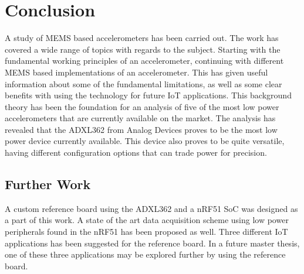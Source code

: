 \chapter{Conclusion}

A study of MEMS based accelerometers has been carried out. The work has covered a wide range of topics with regards to the subject. Starting with the fundamental working principles of an accelerometer, continuing with different MEMS based implementations of an accelerometer. This has given useful information about some of the fundamental limitations, as well as some clear benefits with using the technology for future IoT applications. This background theory has been the foundation for an analysis of five of the most low power accelerometers that are currently available on the market. The analysis has revealed that the ADXL362 from Analog Devices proves to be the most low power device currently available. This device also proves to be quite versatile, having different configuration options that can trade power for precision. 

\section{Further Work}

A custom reference board using the ADXL362 and a nRF51 SoC was designed as a part of this work. A state of the art data acquisition scheme using low power peripherals found in the nRF51 has been proposed as well. Three different IoT applications has been suggested for the reference board. In a future master thesis, one of these three applications may be explored further by using the reference board. 
